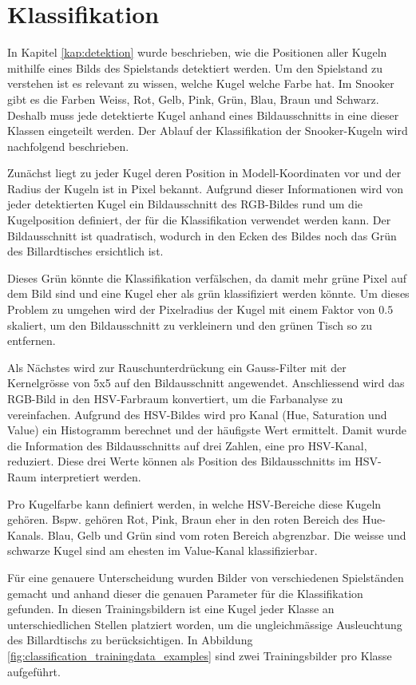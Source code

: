 \newpage
\section{Klassifikation}\label{kap:klassifikation}
In Kapitel \ref{kap:detektion} wurde beschrieben, wie die Positionen aller Kugeln mithilfe eines Bilds des Spielstands detektiert werden.
Um den Spielstand zu verstehen ist es relevant zu wissen, welche Kugel welche Farbe hat.
Im Snooker gibt es die Farben Weiss, Rot, Gelb, Pink, Grün, Blau, Braun und Schwarz.
Deshalb muss jede detektierte Kugel anhand eines Bildausschnitts in eine dieser Klassen eingeteilt werden.
Der Ablauf der Klassifikation der Snooker-Kugeln wird nachfolgend beschrieben.

Zunächst liegt zu jeder Kugel deren Position in Modell-Koordinaten vor und der Radius der Kugeln ist in Pixel bekannt\cite{project2:pixel_to_model_coordinates}.
Aufgrund dieser Informationen wird von jeder detektierten Kugel ein Bildausschnitt des RGB-Bildes rund um die Kugelposition definiert,
der für die Klassifikation verwendet werden kann.
Der Bildausschnitt ist quadratisch, wodurch in den Ecken des Bildes noch das Grün des Billardtisches ersichtlich ist.

Dieses Grün könnte die Klassifikation verfälschen, da damit mehr grüne Pixel auf dem Bild sind und eine Kugel eher als grün klassifiziert werden könnte.
Um dieses Problem zu umgehen wird der Pixelradius der Kugel mit einem Faktor von $0.5$ skaliert, um den Bildausschnitt zu verkleinern
und den grünen Tisch so zu entfernen.

Als Nächstes wird zur Rauschunterdrückung ein Gauss-Filter mit der Kernelgrösse von 5x5 auf den Bildausschnitt angewendet.
Anschliessend wird das RGB-Bild in den HSV-Farbraum\cite{wiki:hsv_color_space} konvertiert, um die Farbanalyse zu vereinfachen.
Aufgrund des HSV-Bildes wird pro Kanal (Hue, Saturation und Value) ein Histogramm berechnet und der häufigste Wert ermittelt.
Damit wurde die Information des Bildausschnitts auf drei Zahlen, eine pro HSV-Kanal, reduziert.
Diese drei Werte können als Position des Bildausschnitts im HSV-Raum interpretiert werden.

Pro Kugelfarbe kann definiert werden, in welche HSV-Bereiche diese Kugeln gehören. Bspw. gehören Rot, Pink, Braun eher in den roten
Bereich des Hue-Kanals. Blau, Gelb und Grün sind vom roten Bereich abgrenzbar.
Die weisse und schwarze Kugel sind am ehesten im Value-Kanal klassifizierbar.

Für eine genauere Unterscheidung wurden Bilder von verschiedenen Spielständen gemacht und anhand dieser die genauen Parameter
für die Klassifikation gefunden. In diesen Trainingsbildern ist eine Kugel jeder Klasse an unterschiedlichen Stellen platziert worden,
um die ungleichmässige Ausleuchtung des Billardtischs zu berücksichtigen.
In Abbildung \ref{fig:classification_trainingdata_examples} sind zwei Trainingsbilder pro Klasse aufgeführt.

